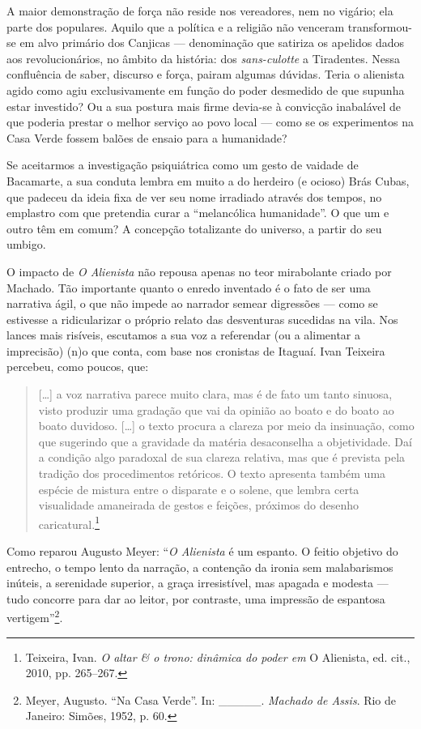 A maior demonstração de força não reside nos vereadores, nem no vigário;
ela parte dos populares. Aquilo que a política e a religião não venceram
transformou-se em alvo primário dos Canjicas --- denominação que satiriza
os apelidos dados aos revolucionários, no âmbito da história: dos
\emph{sans-culotte} a Tiradentes. Nessa confluência de saber, discurso e
força, pairam algumas dúvidas. Teria o alienista agido como agiu
exclusivamente em função do poder desmedido de que supunha estar
investido? Ou a sua postura mais firme devia-se à convicção inabalável
de que poderia prestar o melhor serviço ao povo local --- como se os
experimentos na Casa Verde fossem balões de ensaio para a humanidade?

Se aceitarmos a investigação psiquiátrica como um gesto de vaidade de
Bacamarte, a sua conduta lembra em muito a do herdeiro (e ocioso) Brás
Cubas, que padeceu da ideia fixa de ver seu nome irradiado através dos
tempos, no emplastro com que pretendia curar a ``melancólica
humanidade''. O que um e outro têm em comum? A concepção totalizante do
universo, a partir do seu umbigo.

O impacto de \emph{O Alienista} não repousa apenas no teor mirabolante
criado por Machado. Tão importante quanto o enredo inventado é o fato de
ser uma narrativa ágil, o que não impede ao narrador semear digressões
--- como se estivesse a ridicularizar o próprio relato das desventuras
sucedidas na vila. Nos lances mais risíveis, escutamos a sua voz a
referendar (ou a alimentar a imprecisão) (n)o que conta, com base nos
cronistas de Itaguaí. Ivan Teixeira percebeu, como poucos, que:

\begin{quote}
{[}\ldots{}{]} a voz narrativa parece muito clara, mas é de fato um
tanto sinuosa, visto produzir uma gradação que vai da opinião ao boato e
do boato ao boato duvidoso. {[}\ldots{}{]} o texto procura a clareza por
meio da insinuação, como que sugerindo que a gravidade da matéria
desaconselha a objetividade. Daí a condição algo paradoxal de sua
clareza relativa, mas que é prevista pela tradição dos procedimentos
retóricos. O texto apresenta também uma espécie de mistura entre o
disparate e o solene, que lembra certa visualidade amaneirada de gestos
e feições, próximos do desenho caricatural.\footnote{Teixeira, Ivan.
  \emph{O altar \& o trono: dinâmica do poder em} O Alienista, ed. cit.,
  2010, pp. 265--267.}
\end{quote}

Como reparou Augusto Meyer: ``\emph{O Alienista} é um espanto. O feitio
objetivo do entrecho, o tempo lento da narração, a contenção da ironia
sem malabarismos inúteis, a serenidade superior, a graça irresistível,
mas apagada e modesta --- tudo concorre para dar ao leitor, por
contraste, uma impressão de espantosa vertigem''\footnote{Meyer,
  Augusto. ``Na Casa Verde''. In: \_\_\_\_\_. \emph{Machado de Assis}.
  Rio de Janeiro: Simões, 1952, p. 60.}.

